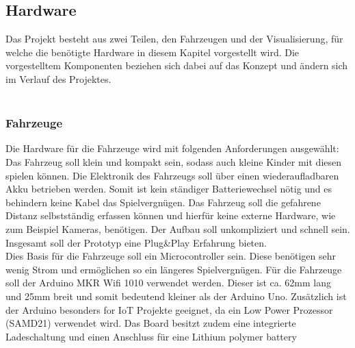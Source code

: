 \documentclass[.../Dokumentation.tex]{subfiles}
\begin{document}
    \subsection{Hardware}\label{sec-components-hardware}
    Das Projekt besteht aus zwei Teilen, den Fahrzeugen und der Visualisierung, für welche die benötigte Hardware in diesem Kapitel vorgestellt wird. Die vorgestelltem Komponenten beziehen sich dabei auf das Konzept und ändern sich im Verlauf des Projektes.\\~\\
    \subsubsection{Fahrzeuge}
	Die Hardware für die Fahrzeuge wird mit folgenden Anforderungen ausgewählt: Das Fahrzeug soll klein und kompakt sein, sodass auch kleine Kinder mit diesen spielen können. Die Elektronik des Fahrzeugs soll über einen wiederaufladbaren Akku betrieben werden. Somit ist kein ständiger Batteriewechsel nötig und es behindern keine Kabel das Spielvergnügen. Das Fahrzeug soll die gefahrene Distanz selbstständig erfassen können und hierfür keine externe Hardware, wie zum Beispiel Kameras, benötigen. Der Aufbau soll unkompliziert und schnell sein. Insgesamt soll der Prototyp eine Plug\&Play Erfahrung bieten.\\
	Dies Basis für die Fahrzeuge soll ein Microcontroller sein. Diese benötigen sehr wenig Strom und ermöglichen so ein längeres Spielvergnügen. Für die Fahrzeuge soll der Arduino MKR Wifi 1010 verwendet werden. Dieser ist ca. 62mm lang und 25mm breit und somit bedeutend kleiner als der Arduino Uno. Zusätzlich ist der Arduino besonders for IoT Projekte geeignet, da ein Low Power Prozessor (SAMD21) verwendet wird. Das Board besitzt zudem eine integrierte Ladeschaltung und einen Anschluss für eine Lithium polymer battery
\end{document}
